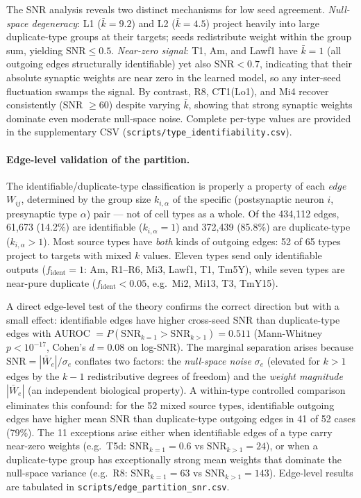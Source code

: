 \documentclass[11pt,a4paper]{article}
\begin{document}
The SNR analysis reveals two distinct mechanisms for low seed agreement.
\emph{Null-space degeneracy}: L1 ($\bar{k}=9.2$) and L2 ($\bar{k}=4.5$) project
heavily into large duplicate-type groups at their targets; seeds redistribute
weight within the group sum, yielding $\mathrm{SNR}\leq 0.5$.
\emph{Near-zero signal}: T1, Am, and Lawf1 have $\bar{k}=1$ (all outgoing edges
structurally identifiable) yet also $\mathrm{SNR}<0.7$, indicating that their
absolute synaptic weights are near zero in the learned model, so any inter-seed
fluctuation swamps the signal.  By contrast, R8, CT1(Lo1), and Mi4 recover
consistently (SNR $\geq 60$) despite varying $\bar{k}$, showing that strong
synaptic weights dominate even moderate null-space noise.  Complete per-type
values are provided in the supplementary CSV ({\tt scripts/type\_identifiability.csv}).

\paragraph{Edge-level validation of the partition.}
The identifiable/duplicate-type classification is properly a property of each
\emph{edge} $W_{ij}$, determined by the group size $k_{i,\alpha}$ of the
specific (postsynaptic neuron $i$, presynaptic type $\alpha$) pair --- not of
cell types as a whole.  Of the 434,112 edges, 61,673 (14.2\%) are identifiable
($k_{i,\alpha}=1$) and 372,439 (85.8\%) are duplicate-type ($k_{i,\alpha}>1$).
Most source types have \emph{both} kinds of outgoing edges: 52 of 65 types
project to targets with mixed $k$ values.  Eleven types send only identifiable
outputs ($f_\text{ident}=1$: Am, R1--R6, Mi3, Lawf1, T1, Tm5Y), while seven
types are near-pure duplicate ($f_\text{ident}<0.05$, e.g.\ Mi2, Mi13, T3,
TmY15).

A direct edge-level test of the theory confirms the correct direction but with
a small effect: identifiable edges have higher cross-seed SNR than duplicate-type
edges with AUROC $= P(\mathrm{SNR}_{k=1} > \mathrm{SNR}_{k>1}) = 0.511$
(Mann-Whitney $p < 10^{-17}$, Cohen's $d = 0.08$ on log-SNR).  The marginal
separation arises because $\mathrm{SNR} = |\bar{W}_e|/\sigma_e$ conflates two
factors: the \emph{null-space noise} $\sigma_e$ (elevated for $k>1$ edges by
the $k-1$ redistributive degrees of freedom) and the \emph{weight magnitude}
$|\bar{W}_e|$ (an independent biological property).  A within-type controlled
comparison eliminates this confound: for the 52 mixed source types, identifiable
outgoing edges have higher mean SNR than duplicate-type outgoing edges in 41 of
52 cases (79\%).  The 11 exceptions arise either when identifiable edges of a
type carry near-zero weights (e.g.\ T5d: $\mathrm{SNR}_{k=1}=0.6$ vs
$\mathrm{SNR}_{k>1}=24$), or when a duplicate-type group has exceptionally
strong mean weights that dominate the null-space variance (e.g.\ R8:
$\mathrm{SNR}_{k=1}=63$ vs $\mathrm{SNR}_{k>1}=143$).
Edge-level results are tabulated in {\tt scripts/edge\_partition\_snr.csv}.
\end{document}
